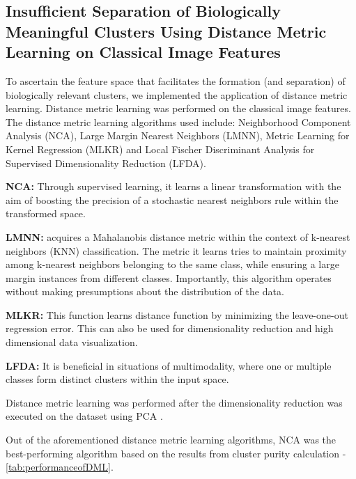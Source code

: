 \documentclass[12pt,a4paper]{article}
\begin{document}
\subsection{Insufficient Separation of Biologically Meaningful Clusters Using Distance Metric Learning on Classical Image Features}

To ascertain the feature space that facilitates the formation (and separation) of biologically relevant clusters, we implemented the application of distance metric learning. Distance metric learning was performed on the classical image features. The distance metric learning algorithms used include: Neighborhood Component Analysis (NCA), Large Margin Nearest Neighbors (LMNN), Metric Learning for Kernel Regression (MLKR) and Local Fischer Discriminant Analysis  for Supervised Dimensionality Reduction (LFDA).

\textbf{NCA:} Through supervised learning, it learns a linear transformation with the aim of boosting the precision of a stochastic nearest neighbors rule within the transformed space.

\textbf{LMNN:} acquires a Mahalanobis distance metric within the context of k-nearest neighbors (KNN) classification. The metric it learns tries to maintain proximity among k-nearest neighbors belonging to the same class, while ensuring a large margin instances from different classes. Importantly, this algorithm operates without making presumptions about the distribution of the data.

\textbf{MLKR:} This function learns distance function by minimizing the leave-one-out regression error. This can also be used for dimensionality reduction and high dimensional data visualization.

\textbf{LFDA:} It is beneficial in situations of multimodality, where one or multiple classes form distinct clusters within the input space.

Distance metric learning was performed after the dimensionality reduction was executed on the dataset using PCA \cite{pca}.

Out of the aforementioned distance metric learning algorithms, NCA was the best-performing algorithm based on the results from cluster purity calculation - \ref{tab:performanceofDML}.
\end{document}
